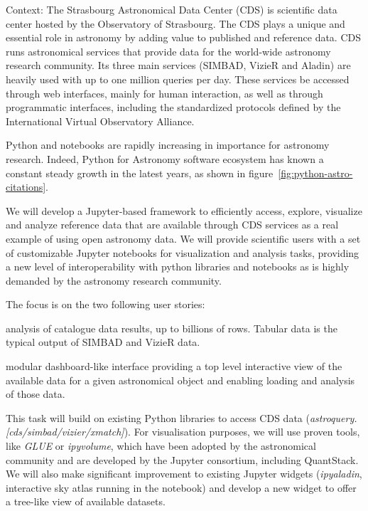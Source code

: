 \begin{task}[
  title=Astronomy application,
  id=astro,
  lead=CDS,
  PM=18,
  wphases={0-48},
  partners={CDS,QS,WTT,SRL}
]

  Context: The Strasbourg Astronomical Data Center (CDS) is scientific data 
  center hosted by the Observatory of Strasbourg. The CDS plays a unique and 
  essential role in astronomy by adding value to published and reference data. 
  CDS runs astronomical services that
  provide data for the world-wide astronomy research community. Its three main
  services (SIMBAD, VizieR and Aladin) are heavily used with up to one million
  queries per day.  These services be accessed through web interfaces, mainly
  for human interaction, as well as through programmatic interfaces, including
  the standardized protocols defined by the International Virtual Observatory
  Alliance.

  Python and notebooks are rapidly increasing in importance for astronomy 
  research. Indeed, Python for Astronomy software ecosystem has known a 
  constant steady growth in the latest years, as shown in 
  figure~\ref{fig:python-astro-citations}.


  We will develop a Jupyter-based framework to efficiently access, explore,
  visualize and analyze reference data that are available through CDS services 
  as a real example of using open astronomy data.
  We will provide scientific users with a set of customizable Jupyter notebooks
  for visualization and analysis tasks, providing a new level of
  interoperability with python libraries and notebooks as is highly demanded
  by the astronomy research community.

  The focus is on the two following user stories:
    \begin{compactitem}
        \item analysis of catalogue data results, up to billions of rows.
              Tabular data is the typical output of SIMBAD and VizieR data.
        \item modular dashboard-like interface providing a top level
              interactive view of the available data for a given astronomical
              object and enabling loading and analysis of those data.
    \end{compactitem}


  This task will build on existing Python libraries to access CDS data
  (\textit{astroquery.[cds/simbad/vizier/xmatch]}). For visualisation 
  purposes, we will use proven tools, like \textit{GLUE} or \textit{ipyvolume}, 
  which have been adopted by the astronomical community and are developed by
  the Jupyter consortium, including QuantStack.
  We will also make significant improvement to existing Jupyter widgets 
  (\textit{ipyaladin}, interactive sky atlas running in the notebook) and 
  develop a new widget to offer a tree-like view of available datasets.


\end{task}
